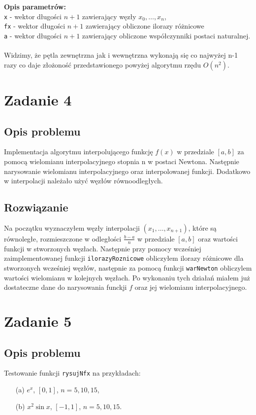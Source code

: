 \documentclass[12pt, a4paper]{article}
\begin{document}
\textbf{Opis parametrów:} \\
\texttt{x} - wektor długości $n + 1$ zawierający węzły $x_{0}, \ldots, x_{n}$, \\
\texttt{fx} - wektor długości $n + 1$ zawierający obliczone ilorazy różnicowe \\
\texttt{a} - wektor długości $n + 1$ zawierający obliczone współczynniki postaci naturalnej.\\\\

Widzimy, że pętla zewnętrzna jak  i wewnętrzna wykonają się co najwyżej n-1 razy 
co daje złożoność przedstawionego powyżej algorytmu rzędu $O(n^2)$.

\section{Zadanie 4}
\subsection{Opis problemu}
Implementacja algorytmu interpolującego funkcję $f(x)$ w przedziale $[a, b]$ za pomocą wielomianu interpolacyjnego stopnia n w postaci Newtona. Następnie narysowanie wielomianu interpolacyjnego oraz interpolowanej funkcji. Dodatkowo w interpolacji należało użyć węzłów równoodległych.

\subsection{Rozwiązanie}
Na początku wyznaczyłem węzły interpolacji $(x_1,\dots,x_{n+1})$, które są równoległe, rozmieszczone w odległości $\frac{b-a}{n}$ w przedziale $[a, b]$ oraz wartości funkcji w stworzonych węzłach. Następnie przy pomocy wcześniej zaimplementowanej funkcji \texttt{ilorazyRoznicowe} obliczyłem ilorazy różnicowe dla stworzonych wcześniej węzłów, następnie za pomocą funkcji \texttt{warNewton} obliczylem wartości wielomianu w kolejnych węzłach. Po wykonaniu tych działań miałem już dostateczne dane do narysowania funckji $f$ oraz jej wielomianu interpolacyjnego.
										
\section{Zadanie 5}
\subsection{Opis problemu}
Testowanie funkcji \texttt{rysujNfx} na przykładach:
\begin{itemize}
    \item[(a)] $e^{x}$, $[0, 1]$, $n = 5, 10, 15$,
    \item[(b)] $x^{2} \sin x$, $[-1, 1]$, $n = 5, 10, 15$.
\end{itemize}
\end{document}
